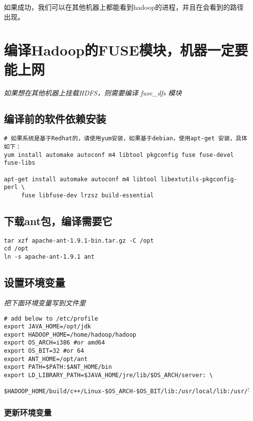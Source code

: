 \documentclass{article}
\begin{document}
如果成功，我们可以在其他机器上都能看到hadoop的进程，并且在会看到的路径
出现。

\section{编译Hadoop的FUSE模块，机器一定要能上网}
\textit{如果想在其他机器上挂载HDFS，则需要编译 fuse\_dfs 模块}
\subsection{编译前的软件依赖安装}
\begin{verbatim}
# 如果系统是基于Redhat的，请使用yum安装，如果基于debian，使用apt-get 安装，具体如下：
yum install automake autoconf m4 libtool pkgconfig fuse fuse-devel fuse-libs

apt-get install automake autoconf m4 libtool libextutils-pkgconfig-perl \
	 fuse libfuse-dev lrzsz build-essential
\end{verbatim}

\subsection{下载ant包，编译需要它}
\begin{verbatim}
tar xzf apache-ant-1.9.1-bin.tar.gz -C /opt
cd /opt
ln -s apache-ant-1.9.1 ant

\end{verbatim}

\subsection{设置环境变量}
\textit{把下面环境变量写到文件里}
\begin{verbatim}
# add below to /etc/profile
export JAVA_HOME=/opt/jdk
export HADOOP_HOME=/home/hadoop/hadoop
export OS_ARCH=i386 #or amd64
export OS_BIT=32 #or 64
export ANT_HOME=/opt/ant
export PATH=$PATH:$ANT_HOME/bin
export LD_LIBRARY_PATH=$JAVA_HOME/jre/lib/$OS_ARCH/server: \
	$HADOOP_HOME/build/c++/Linux-$OS_ARCH-$OS_BIT/lib:/usr/local/lib:/usr/lib
\end{verbatim}

\subsubsection{更新环境变量}
\end{document}
